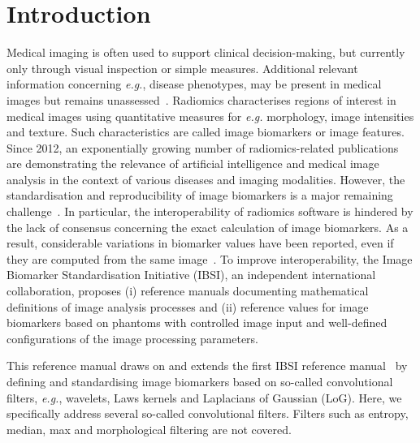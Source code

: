\documentclass[fleqn,a4paper,oneside,openany]{book}
\begin{document}
\chapter{Introduction}
%
Medical imaging is often used to support clinical decision-making, but currently only through visual inspection or simple measures.
Additional relevant information concerning \textit{e.g.}, disease phenotypes, may be present in medical images but remains unassessed~\cite{Lambin2017}.
Radiomics characterises regions of interest in medical images using quantitative measures for \textit{e.g.} morphology, image intensities and texture.
Such characteristics are called image biomarkers or image features.
Since 2012, an exponentially growing number of radiomics-related publications are demonstrating the relevance of artificial intelligence and medical image analysis in the context of various diseases and imaging modalities.
However, the standardisation and reproducibility of image biomarkers is a major remaining challenge~\cite{Zwanenburg2019-ky}.
In particular, the interoperability of radiomics software is hindered by the lack of consensus concerning the exact calculation of image biomarkers.
As a result, considerable variations in biomarker values have been reported, even if they are computed from the same image~\cite{Hatt2017-zp,Bogowicz2017-kh,Foy2018-mx}.
To improve interoperability, the Image Biomarker Standardisation Initiative (IBSI), an independent international collaboration, proposes (i) reference manuals documenting mathematical definitions of image analysis processes and (ii) reference values for image biomarkers based on phantoms with controlled image input and well-defined configurations of the image processing parameters.

This reference manual draws on and extends the first IBSI reference manual~\cite{ZLV2017} by defining and standardising image biomarkers based on so-called convolutional filters, \textit{e.g.}, wavelets, Laws kernels and Laplacians of Gaussian (LoG).
Here, we specifically address several so-called convolutional filters.
Filters such as entropy, median, max and morphological filtering are not covered.
\end{document}
